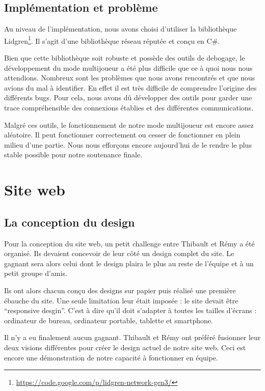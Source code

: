 \documentclass[11pt]{report}
\begin{document}
\section{Implémentation et problème}

Au niveau de l'implémentation, nous avons choisi d'utiliser la bibliothèque Lidgren\footnote{\url{https://code.google.com/p/lidgren-network-gen3/}}. Il s'agit d'une bibliothèque réseau réputée et conçu en C\#.

Bien que cette bibliothèque soit robuste et possède des outils de debogage, le développement du mode multijoueur a été plus difficile que ce à quoi nous nous attendions. Nombreux sont les problèmes que nous avons rencontrés et que nous avions du mal à identifier. En effet il est très difficile de comprendre l'origine des différents bugs. Pour cela, nous avons dû développer des outils pour garder une trace compréhensible des connexions établies et des différentes communications.

Malgré ces outils, le fonctionnement de notre mode multijoueur est encore assez aléatoire. Il peut fonctionner correctement ou cesser de fonctionner en plein milieu d'une partie. Nous nous efforçons encore aujourd'hui de le rendre le plus stable possible pour notre soutenance finale.

\chapter{Site web}

\section{La conception du design}

Pour la conception du site web, un petit challenge entre Thibault et Rémy a été organisé. Ils devaient concevoir de leur côté un design complet du site. Le gagnant sera alors celui dont le design plaira le plus au reste de l'équipe et à un petit groupe d'amis.

Ils ont alors chacun conçu des designs sur papier puis réalisé une première ébauche du site. Une seule limitation leur était imposée : le site devait être ``responsive desgin''. C'est à dire qu'il doit s'adapter à toutes les tailles d'écrans : ordinateur de bureau, ordinateur portable, tablette et smartphone.

Il n'y a eu finalement aucun gagnant. Thibault et Rémy ont préféré fusionner leur deux visions différentes pour créer le design actuel de notre site web. Ceci est encore une démonstration de notre capacité à fonctionner en équipe.
\end{document}
